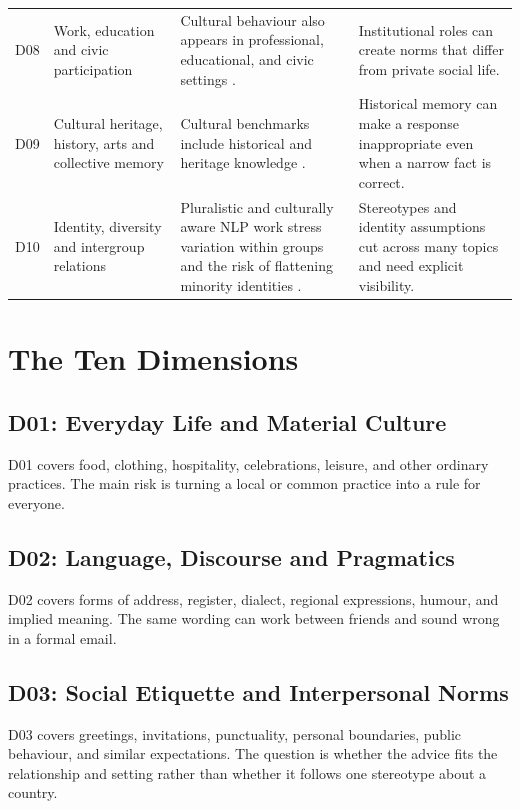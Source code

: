 \begin{longtable}{p{}p{}p{}p{}}
D08 & Work, education and civic participation & Cultural behaviour also appears in professional, educational, and civic settings \parencite{adilazuarda2024culture,liu2025culturally}. & Institutional roles can create norms that differ from private social life. \\
D09 & Cultural heritage, history, arts and collective memory & Cultural benchmarks include historical and heritage knowledge \parencite{chiu2025culturalbench,adilazuarda2024culture}. & Historical memory can make a response inappropriate even when a narrow fact is correct. \\
D10 & Identity, diversity and intergroup relations & Pluralistic and culturally aware NLP work stress variation within groups and the risk of flattening minority identities \parencite{sorensen2024pluralistic,liu2025culturally}. & Stereotypes and identity assumptions cut across many topics and need explicit visibility. \\
\bottomrule
\end{longtable}

\section{The Ten Dimensions}

\subsection{D01: Everyday Life and Material Culture}

D01 covers food, clothing, hospitality, celebrations, leisure, and other ordinary practices. The main risk is turning a local or common practice into a rule for everyone.

\subsection{D02: Language, Discourse and Pragmatics}

D02 covers forms of address, register, dialect, regional expressions, humour, and implied meaning. The same wording can work between friends and sound wrong in a formal email.

\subsection{D03: Social Etiquette and Interpersonal Norms}

D03 covers greetings, invitations, punctuality, personal boundaries, public behaviour, and similar expectations. The question is whether the advice fits the relationship and setting rather than whether it follows one stereotype about a country.

